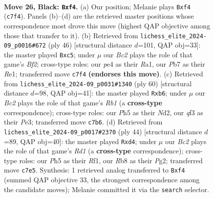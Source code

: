 \documentclass[11pt]{article}
\begin{document}
\clearpage

\begin{figure}[p]\centering
\begin{subfigure}{0.46\textwidth}\centering
\resizebox{\linewidth}{!}{%
\newchessgame
\chessboard[
  setfen={1r1r4/ppb2pk1/8/6qp/b3PB2/5QPp/PP3P2/RB2R1K1 b - - 0 26},
  showmover=false,
  pgfstyle=straightmove, color=movearrow, markmove={c7-f4}
]}
\caption{}
\end{subfigure}\hfill
\begin{subfigure}{0.46\textwidth}\centering
\resizebox{\linewidth}{!}{%
\newchessgame
\chessboard[
  setfen={rn3r1k/p4Ppp/2p1Q3/q1b5/1pB2PP1/8/PP3B2/R3R1K1 w - - 1 24},
  showmover=false,
  pgfstyle=straightmove, color=movearrow, markmove={f2-c5}
]}
\caption{}
\end{subfigure}
\\[4pt]
\begin{subfigure}{0.46\textwidth}\centering
\resizebox{\linewidth}{!}{%
\newchessgame
\chessboard[
  setfen={1k1rb2r/pp3qpp/1b3p2/Q3p3/6B1/P2PP2P/3N1PP1/1RR3K1 w - - 1 31},
  showmover=false,
  pgfstyle=straightmove, color=movearrow, markmove={b1-b6}
]}
\caption{}
\end{subfigure}\hfill
\begin{subfigure}{0.46\textwidth}\centering
\resizebox{\linewidth}{!}{%
\newchessgame
\chessboard[
  setfen={r1b2rk1/1p3pp1/pq2pP1p/7B/3b3B/4Q3/6PP/3R1RK1 w - - 0 23},
  showmover=false,
  pgfstyle=straightmove, color=movearrow, markmove={d1-d4}
]}
\caption{}
\end{subfigure}
\caption{\textbf{Move 26, Black: \texttt{Bxf4}.} (a) Our position; Melanie plays \texttt{Bxf4} (\texttt{c7f4}). Panels (b)--(d) are the retrieved master positions whose correspondence most drove this move (highest QAP objective among those that transfer to it). (b) Retrieved from \texttt{lichess\_elite\_2024-09\_p0016\#672} (ply 46) [structural distance $d$=101, QAP obj=33]: the master played \texttt{Bxc5}; under $\mu$ our \emph{Bc2} plays the role of that game's \emph{Bf2}; cross-type roles: our \emph{p}e4 as their \emph{R}a1, our \emph{P}b7 as their \emph{R}e1; transferred move \texttt{c7f4} \textbf{(endorses this move)}. (c) Retrieved from \texttt{lichess\_elite\_2024-09\_p0031\#1340} (ply 60) [structural distance $d$=98, QAP obj=41]: the master played \texttt{Rxb6}; under $\mu$ our \emph{Bc2} plays the role of that game's \emph{Rb1} (a \textbf{cross-type} correspondence); cross-type roles: our \emph{P}h5 as their \emph{N}d2, our \emph{q}f3 as their \emph{P}e3; transferred move \texttt{c7b6}. (d) Retrieved from \texttt{lichess\_elite\_2024-09\_p0017\#2370} (ply 44) [structural distance $d$=89, QAP obj=40]: the master played \texttt{Rxd4}; under $\mu$ our \emph{Bc2} plays the role of that game's \emph{Rd1} (a \textbf{cross-type} correspondence); cross-type roles: our \emph{P}h5 as their \emph{R}f1, our \emph{R}b8 as their \emph{P}g2; transferred move \texttt{c7e5}. Synthesis: 1 retrieved analog transferred to \texttt{Bxf4} (summed QAP objective 33, the strongest correspondence among the candidate moves); Melanie committed it via the \texttt{search} selector.}
\label{fig:thought-m51}
\end{figure}
\end{document}
